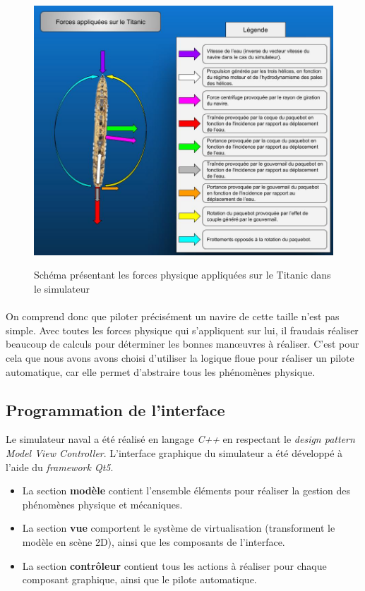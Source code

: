 \documentclass[a4paper,11pt]{article}
\begin{document}
    \begin{figure}[H]
        \begin{center}
            \caption{Schéma présentant les forces physique appliquées sur le Titanic dans le simulateur}
            \includegraphics[scale=0.56]{assets/Isaac_vs_Titanic.jpg}
            \label{fig:titanicForces}
        \end{center}
    \end{figure}
    \paragraph{}
    On comprend donc que piloter précisément un navire de cette taille n'est pas simple. Avec toutes les forces physique qui s'appliquent sur lui, il fraudais réaliser beaucoup de calculs pour déterminer les bonnes manœuvres à réaliser. C'est pour cela que nous avons avons choisi d'utiliser la logique floue pour réaliser un pilote automatique, car elle permet d’abstraire tous les phénomènes physique.

    \subsection{Programmation de l'interface}
    Le simulateur naval a été réalisé en langage \textit{C++} en respectant le \textit{design pattern Model View Controller}. L'interface graphique du simulateur a été développé à l'aide du \textit{framework Qt5}.

    \begin{itemize}
        \item La section \textbf{modèle} contient l'ensemble éléments pour réaliser la gestion des phénomènes physique et mécaniques.
        \item La section \textbf{vue} comportent le système de virtualisation (transforment le modèle en scène 2D), ainsi que les composants de l'interface.
        \item La section \textbf{contrôleur} contient tous les actions à réaliser pour chaque composant graphique, ainsi que le pilote automatique.
    \end{itemize} 
\end{document}

